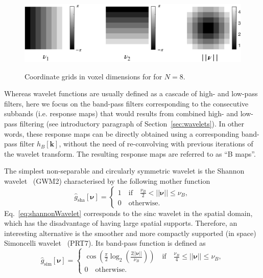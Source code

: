 \documentclass[fleqn,a4paper,oneside,openany]{book}
\newcommand\textid[1]{{\normalsize{\idfont #1}}}
\begin{document}
%
\begin{figure}
\centering
\includegraphics[trim = 0 0 0 0, clip, width=.8\linewidth]{coordinateGridsFourier.png}\\
\caption{Coordinate grids in voxel dimensions for for $N=8$.}
  \label{fig:coordinateGridsFourier}
\end{figure}
%

Whereas wavelet functions are usually defined as a cascade of high- and low-pass filters, here we focus on the band-pass filters corresponding to the consecutive subbands (i.e. response maps) that would results from combined high- and low- pass filtering (see introductory paragraph of Section~\ref{sec:wavelets}). In other words, these response maps can be directly obtained using a corresponding band-pass filter $h_B[\boldsymbol{k}]$, without the need of re-convolving with previous iterations of the wavelet transform. The resulting response maps are referred to as ``B maps''.

The simplest non-separable and circularly symmetric wavelet is the Shannon wavelet~\cite{UCV2011} (\textid{GWM2}) characterised by the following mother function
%
\begin{equation}\label{eq:shannonWavelet}
\hat{g}_{\text{sha}}[\boldsymbol{\nu}]=
\begin{cases}
1\quad\text{if}\quad\frac{\nu_B}{2}< ||\boldsymbol{\nu}|| \leq \nu_B,\\
0\quad\text{otherwise}.
\end{cases}
\end{equation}
%
Eq.~\eqref{eq:shannonWavelet} corresponds to the sinc wavelet in the spatial domain, which has the disadvantage of having large spatial supports. Therefore, an interesting alternative is the smoother and more compactly supported (in space) Simoncelli wavelet~\cite{PoS2000} (\textid{PRT7}). Its band-pass function is defined as
%
\begin{equation}\label{eq:simoncelliWavelet}
\hat{g}_{\text{sim}}[\boldsymbol{\nu}]=
\begin{cases}
\cos\left(\frac{\pi}{2}\log_2\left(\frac{2||\boldsymbol{\nu}||}{\nu_B}\right)\right)\quad\text{if}\quad\frac{\nu_B}{4}\leq ||\boldsymbol{\nu}|| \leq \nu_B,\\
0\quad\text{otherwise}.
\end{cases}
\end{equation}
%
\end{document}
